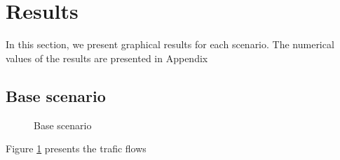 \section{Results}

In this section, we present graphical results for each scenario. The numerical values of the results are presented in Appendix 

\subsection{Base scenario}

\begin{figure}
    \centering
    
    \caption{Base scenario}
    \label{fig:base_scenario}
\end{figure}

Figure \ref{fig:base_scenario} presents the trafic flows  